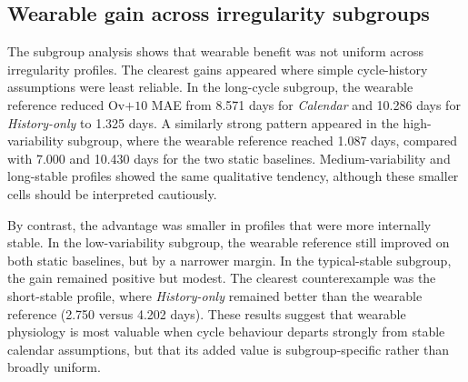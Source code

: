 \documentclass[conference]{IEEEtran}
\begin{document}
\subsection{Wearable gain across irregularity subgroups}

\begin{table}[t]
\caption{\normalfont Representative subgroup comparison of wearable gain beyond static references. Values are Ov$+10$ MAE in days with 95\% bootstrap CIs. Small cells are exploratory.}
\label{tab:subgroup_wearable}
\centering
\scriptsize
{}
\end{table}

The subgroup analysis shows that wearable benefit was not uniform across irregularity profiles. The clearest gains appeared where simple cycle-history assumptions were least reliable. In the long-cycle subgroup, the wearable reference reduced Ov$+10$ MAE from 8.571 days for \textit{Calendar} and 10.286 days for \textit{History-only} to 1.325 days. A similarly strong pattern appeared in the high-variability subgroup, where the wearable reference reached 1.087 days, compared with 7.000 and 10.430 days for the two static baselines. Medium-variability and long-stable profiles showed the same qualitative tendency, although these smaller cells should be interpreted cautiously.

By contrast, the advantage was smaller in profiles that were more internally stable. In the low-variability subgroup, the wearable reference still improved on both static baselines, but by a narrower margin. In the typical-stable subgroup, the gain remained positive but modest. The clearest counterexample was the short-stable profile, where \textit{History-only} remained better than the wearable reference (2.750 versus 4.202 days). These results suggest that wearable physiology is most valuable when cycle behaviour departs strongly from stable calendar assumptions, but that its added value is subgroup-specific rather than broadly uniform.
\end{document}
